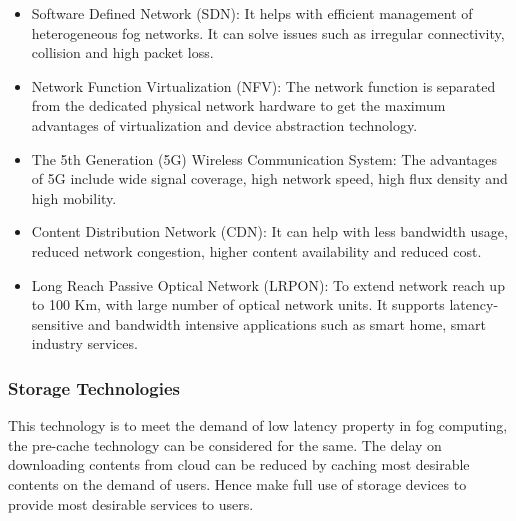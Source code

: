 \documentclass[10pt,a4paper,journal]{IEEEtran}
\begin{document}
\begin{itemize}
\item	Software Defined Network (SDN): It helps with efficient management of heterogeneous fog networks. It can solve issues such as irregular connectivity, collision and high packet loss.
\item Network Function Virtualization (NFV): The network function is separated from the dedicated physical network hardware to get the maximum advantages of virtualization and device abstraction technology. 
\item The 5th Generation (5G) Wireless Communication System: The advantages of 5G include wide signal coverage, high network speed, high flux density and high mobility. 
\item Content Distribution Network (CDN): It can help with less bandwidth usage, reduced network congestion, higher content availability and reduced cost.
\item Long Reach Passive Optical Network (LRPON): To extend network reach up to 100 Km, with large number of optical network units. It supports latency-sensitive and bandwidth intensive applications such as smart home, smart industry services.

\end{itemize}

\subsubsection{Storage Technologies} This technology is to meet the demand of low latency property in fog computing, the pre-cache technology can be considered for the same. The delay on downloading contents from cloud can be reduced by caching most desirable contents on the demand of users. Hence make full use of storage devices to provide most desirable services to users.
\end{document}
